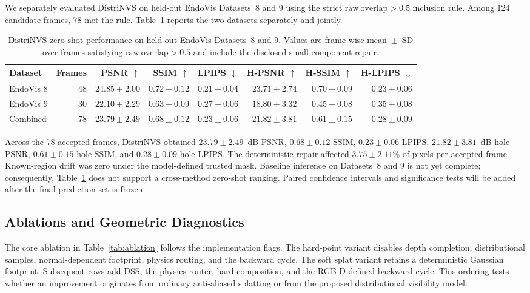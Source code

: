 \documentclass[letterpaper,10pt,conference]{ieeeconf}
\begin{document}
We separately evaluated DistriNVS on held-out EndoVis Datasets~8 and 9 using
the strict $\mathrm{raw\ overlap}>0.5$ inclusion rule. Among 124 candidate
frames, 78 met the rule. Table~\ref{tab:zeroshot-breakdown} reports the two
datasets separately and jointly.

\begin{table}[t]
\centering
\caption{DistriNVS zero-shot performance on held-out EndoVis Datasets~8 and 9.
Values are frame-wise mean~$\pm$~SD over frames satisfying
$\mathrm{raw\ overlap}>0.5$ and include the disclosed small-component repair.}
\label{tab:zeroshot-breakdown}
\setlength{\tabcolsep}{3.2pt}
\begin{tabular}{lrrrrrrr}
\toprule
Dataset & Frames & PSNR $\uparrow$ & SSIM $\uparrow$ & LPIPS $\downarrow$ &
H-PSNR $\uparrow$ & H-SSIM $\uparrow$ & H-LPIPS $\downarrow$ \\
\midrule
EndoVis 8 & 48 & $\mathbf{24.85\pm2.00}$ & $\mathbf{0.72\pm0.12}$ &
$\mathbf{0.21\pm0.04}$ & $\mathbf{23.71\pm2.74}$ &
$\mathbf{0.70\pm0.09}$ & $\mathbf{0.23\pm0.06}$ \\
EndoVis 9 & 30 & $22.10\pm2.29$ & $0.63\pm0.09$ & $0.27\pm0.06$ &
$18.80\pm3.32$ & $0.45\pm0.08$ & $0.35\pm0.08$ \\
\midrule
Combined & 78 & $23.79\pm2.49$ & $0.68\pm0.12$ & $0.23\pm0.06$ &
$21.82\pm3.81$ & $0.61\pm0.15$ & $0.28\pm0.09$ \\
\bottomrule
\end{tabular}
\end{table}

Across the 78 accepted frames, DistriNVS obtained
$23.79\pm2.49$~dB PSNR, $0.68\pm0.12$ SSIM,
$0.23\pm0.06$ LPIPS, $21.82\pm3.81$~dB hole PSNR,
$0.61\pm0.15$ hole SSIM, and $0.28\pm0.09$ hole LPIPS. The deterministic
repair affected $3.75\pm2.11$\% of pixels per accepted frame. Known-region
drift was zero under the model-defined trusted mask. Baseline inference on
Datasets~8 and 9 is not yet complete; consequently,
Table~\ref{tab:zeroshot-breakdown} does not support a cross-method zero-shot
ranking. Paired confidence intervals and significance tests will be added after
the final prediction set is frozen.

\subsection{Ablations and Geometric Diagnostics}

The core ablation in Table~\ref{tab:ablation} follows the implementation flags.
The hard-point variant disables depth completion, distributional samples,
normal-dependent footprint, physics routing, and the backward cycle. The soft
splat variant retains a deterministic Gaussian footprint. Subsequent rows add
DSS, the physics router, hard composition, and the RGB-D-defined backward
cycle. This ordering tests whether an improvement originates from ordinary
anti-aliased splatting or from the proposed distributional visibility model.
\end{document}
